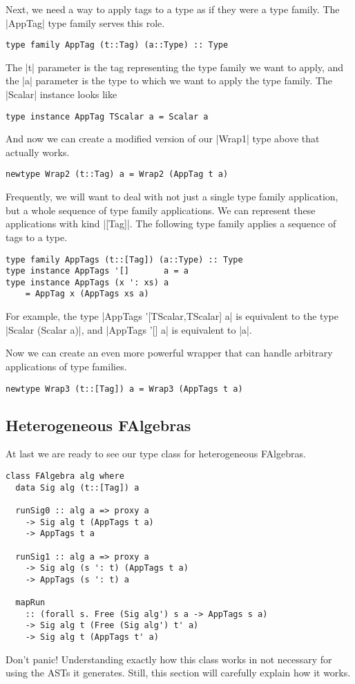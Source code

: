 \documentclass[preprint]{sigplanconf}
\theoremstyle{definition}
\begin{document}
Next, we need a way to apply tags to a type as if they were a type family.
The |AppTag| type family serves this role.
\begin{lstlisting}
type family AppTag (t::Tag) (a::Type) :: Type
\end{lstlisting}
The |t| parameter is the tag representing the type family we want to apply,
and the |a| parameter is the type to which we want to apply the type family.
The |Scalar| instance looks like
\begin{lstlisting}
type instance AppTag TScalar a = Scalar a
\end{lstlisting}
And now we can create a modified version of our |Wrap1| type above that actually works.
\begin{lstlisting}
newtype Wrap2 (t::Tag) a = Wrap2 (AppTag t a)
\end{lstlisting}

Frequently, we will want to deal with not just a single type family application,
but a whole sequence of type family applications.
We can represent these applications with kind |[Tag]|.
The following type family applies a sequence of tags to a type.
\begin{lstlisting}
type family AppTags (t::[Tag]) (a::Type) :: Type
type instance AppTags '[]       a = a
type instance AppTags (x ': xs) a
    = AppTag x (AppTags xs a)
\end{lstlisting}
For example, the type
|AppTags '[TScalar,TScalar] a|
is equivalent to the type
|Scalar (Scalar a)|,
and
|AppTags '[] a| is equivalent to |a|.

Now we can create an even more powerful wrapper that can handle arbitrary applications of type families.
\begin{lstlisting}
newtype Wrap3 (t::[Tag]) a = Wrap3 (AppTags t a)
\end{lstlisting}

\subsection{Heterogeneous FAlgebras}

At last we are ready to see our type class for heterogeneous FAlgebras.
\begin{lstlisting}
class FAlgebra alg where
  data Sig alg (t::[Tag]) a

  runSig0 :: alg a => proxy a
    -> Sig alg t (AppTags t a)
    -> AppTags t a

  runSig1 :: alg a => proxy a
    -> Sig alg (s ': t) (AppTags t a)
    -> AppTags (s ': t) a

  mapRun
    :: (forall s. Free (Sig alg') s a -> AppTags s a)
    -> Sig alg t (Free (Sig alg') t' a)
    -> Sig alg t (AppTags t' a)
\end{lstlisting}
Don't panic!
Understanding exactly how this class works in not necessary for using the ASTs it generates.
Still, this section will carefully explain how it works.
\end{document}
